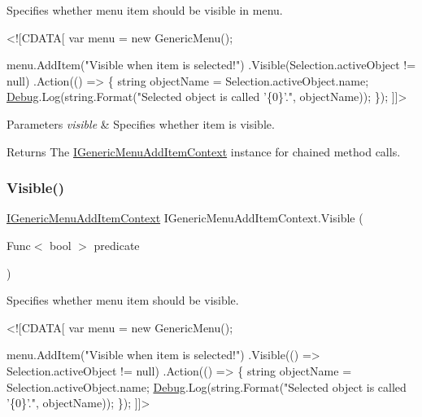 Specifies whether menu item should be visible in menu. 


\begin{DoxyCode}
<![CDATA[
var menu = \textcolor{keyword}{new} GenericMenu();

menu.AddItem(\textcolor{stringliteral}{"Visible when item is selected!"})
    .Visible(Selection.activeObject != null)
    .Action(() => \{
        \textcolor{keywordtype}{string} objectName = Selection.activeObject.name;
        \hyperlink{namespace_debug}{Debug}.Log(\textcolor{keywordtype}{string}.Format(\textcolor{stringliteral}{"Selected object is called '\{0\}'."}, objectName));
    \});
]]>
\end{DoxyCode}
 


\begin{DoxyParams}{Parameters}
{\em visible} & Specifies whether item is visible.\\
\hline
\end{DoxyParams}
\begin{DoxyReturn}{Returns}
The \hyperlink{interface_i_generic_menu_add_item_context}{I\+Generic\+Menu\+Add\+Item\+Context} instance for chained method calls. 
\end{DoxyReturn}
\mbox{\label{interface_i_generic_menu_add_item_context_a02cbabcb5e584a278107f71f822a190d}} 
\subsubsection{\texorpdfstring{Visible()}{Visible()}\hspace{0.1cm}{\footnotesize\ttfamily [2/2]}}
{\footnotesize\ttfamily \hyperlink{interface_i_generic_menu_add_item_context}{I\+Generic\+Menu\+Add\+Item\+Context} I\+Generic\+Menu\+Add\+Item\+Context.\+Visible (\begin{DoxyParamCaption}\item[{Func$<$ bool $>$}]{predicate }\end{DoxyParamCaption})}



Specifies whether menu item should be visible. 


\begin{DoxyCode}
<![CDATA[
var menu = \textcolor{keyword}{new} GenericMenu();

menu.AddItem(\textcolor{stringliteral}{"Visible when item is selected!"})
    .Visible(() => Selection.activeObject != null)
    .Action(() => \{
        \textcolor{keywordtype}{string} objectName = Selection.activeObject.name;
        \hyperlink{namespace_debug}{Debug}.Log(\textcolor{keywordtype}{string}.Format(\textcolor{stringliteral}{"Selected object is called '\{0\}'."}, objectName));
    \});
]]>
\end{DoxyCode}
 


